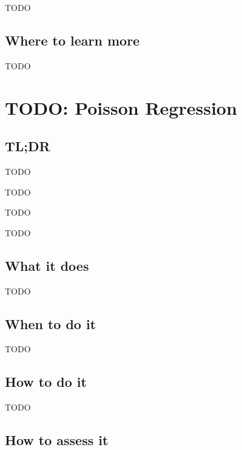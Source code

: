 \documentclass[
]{book}
\providecommand{\tightlist}{%
  \setlength{\itemsep}{0pt}\setlength{\parskip}{0pt}}
\begin{document}
TODO

\hypertarget{where-to-learn-more-7}{%
\section{Where to learn more}\label{where-to-learn-more-7}}

TODO

\hypertarget{poisson-regression}{%
\chapter{TODO: Poisson Regression}\label{poisson-regression}}

\hypertarget{tldr-8}{%
\section{TL;DR}\label{tldr-8}}

\begin{description}
\tightlist
\item[What it does]
TODO
\item[When to do it]
TODO
\item[How to do it]
TODO
\item[How to assess it]
TODO
\end{description}

\hypertarget{what-it-does-8}{%
\section{What it does}\label{what-it-does-8}}

TODO

\hypertarget{when-to-do-it-8}{%
\section{When to do it}\label{when-to-do-it-8}}

TODO

\hypertarget{how-to-do-it-8}{%
\section{How to do it}\label{how-to-do-it-8}}

TODO

\hypertarget{how-to-assess-it-8}{%
\section{How to assess it}\label{how-to-assess-it-8}}
\end{document}
